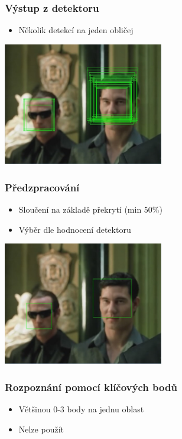\documentclass{beamer}
\begin{document}
	\begin{frame}[t,fragile]
		\frametitle{Výstup z detektoru}	
		
		\begin{itemize}
			\item Několik detekcí na jeden obličej
		\end{itemize}			
\begin{center}
\includegraphics[width=7cm]{img/detections.jpg}
\end{center}
	\end{frame}		
	\begin{frame}[t,fragile]
		\frametitle{Předzpracování}	
		
		\begin{itemize}
			\item Sloučení na základě překrytí (min 50\%)
			\item Výběr dle hodnocení detektoru
		\end{itemize}			
\begin{center}
\includegraphics[width=7cm]{img/sepDet.jpg}
\end{center}
	\end{frame}	
	\begin{frame}[t,fragile]
		\frametitle{Rozpoznání pomocí klíčových bodů}	
		
		\begin{itemize}
			\item Většinou 0-3 body na jednu oblast
			\item Nelze použít
		\end{itemize}			
	\end{frame}				
\end{document}
